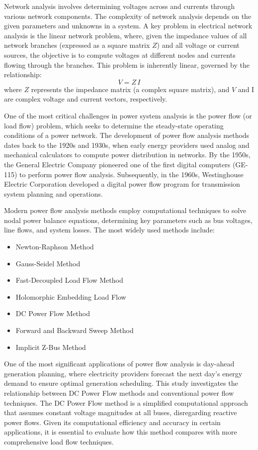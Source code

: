 \documentclass[11pt, a4paper]{article}
\theoremstyle{definition}
\theoremstyle{plain}
\theoremstyle{plain}
\theoremstyle{remark}
\theoremstyle{remark}
\theoremstyle{remark}
\begin{document}
Network analysis involves determining voltages across and currents through various network components. The complexity of network analysis depends on the given parameters and unknowns in a system. A key problem in electrical network analysis is the linear network problem, where, given the impedance values of all network branches (expressed as a square matrix $ Z $) and all voltage or current sources, the objective is to compute voltages at different nodes and currents flowing through the branches. This problem is inherently linear, governed by the relationship:
\[
V = Z\,I
\]
where $ Z $ represents the impedance matrix (a complex square matrix), and $ V $ and I are complex voltage and current vectors, respectively.

One of the most critical challenges in power system analysis is the power flow (or load flow) problem, which seeks to determine the steady-state operating conditions of a power network. The development of power flow analysis methods dates back to the 1920s and 1930s, when early energy providers used analog and mechanical calculators to compute power distribution in networks. By the 1950s, the General Electric Company pioneered one of the first digital computers (GE-115) to perform power flow analysis. Subsequently, in the 1960s, Westinghouse Electric Corporation developed a digital power flow program for transmission system planning and operations.

Modern power flow analysis methods employ computational techniques to solve nodal power balance equations, determining key parameters such as bus voltages, line flows, and system losses. The most widely used methods include:
\begin{itemize}
	\item Newton-Raphson Method
	\item Gauss-Seidel Method
	\item Fast-Decoupled Load Flow Method
	\item Holomorphic Embedding Load Flow
	\item DC Power Flow Method
	\item Forward and Backward Sweep Method
	\item Implicit Z-Bus Method
\end{itemize}
One of the most significant applications of power flow analysis is day-ahead generation planning, where electricity providers forecast the next day’s energy demand to ensure optimal generation scheduling.
This study investigates the relationship between DC Power Flow methods and conventional power flow techniques. The DC Power Flow method is a simplified computational approach that assumes constant voltage magnitudes at all buses, disregarding reactive power flows. Given its computational efficiency and accuracy in certain applications, it is essential to evaluate how this method compares with more comprehensive load flow techniques.
\end{document}
